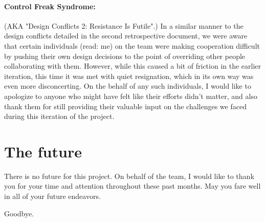 \documentclass{article}
\begin{document}
\paragraph{Control Freak Syndrome:} (AKA "Design Conflicts 2: Resistance Is Futile".) In a similar manner to the design conflicts detailed in the second retrospective document, we were aware that certain individuals (read: me) on the team were making cooperation difficult by pushing their own design decisions to the point of overriding other people collaborating with them. However, while this caused a bit of friction in the earlier iteration, this time it was met with quiet resignation, which in its own way was even more disconcerting. On the behalf of any such individuals, I would like to apologize to anyone who might have felt like their efforts didn't matter, and also thank them for still providing their valuable input on the challenges we faced during this iteration of the project.

\section*{The future}

There is no future for this project. On behalf of the team, I would like to thank you for your time and attention throughout these past months. May you fare well in all of your future endeavors.

Goodbye.
\end{document}
